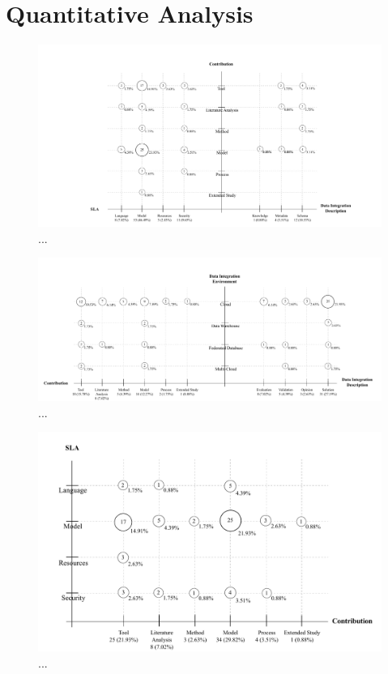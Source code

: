 \section{Quantitative Analysis}

\begin{figure}[h!]
\centering
\includegraphics[scale=0.5]{figs/bubble-charts/Contribution-SLA-DIdescription.pdf} 
\caption{...}
\end{figure}

\begin{figure}[h!]
\centering
\includegraphics[scale=0.5]{figs/bubble-charts/DI-Environment-Contribution-Research.pdf}
\caption{...}
\end{figure}

\begin{figure}[h!]
\centering
\includegraphics[scale=0.7]{figs/bubble-charts/SLA-Contribution.pdf}
\caption{...}
\end{figure}

